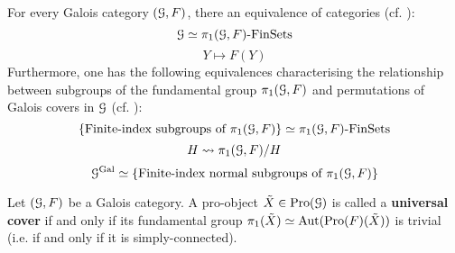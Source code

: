             \begin{proposition} \label{prop: categorical_galois_correspondence}
                For every Galois category $(\mathcal{G}, F)$, there an equivalence of categories (cf. \cite[Propositions 5.2]{SGA1}):
                    $$\mathcal{G} \simeq \pi_1(\mathcal{G}, F)\text{-}\mathrm{Fin}\mathrm{Sets}$$
                    $$Y \mapsto F(Y)$$
                Furthermore, one has the following equivalences characterising the relationship between subgroups of the fundamental group $\pi_1(\mathcal{G}, F)$ and permutations of Galois covers in $\mathcal{G}$ (cf. \cite[Propositions 5.5]{SGA1}):
                    $$\{\text{Finite-index subgroups of $\pi_1(\mathcal{G}, F)$}\} \simeq \pi_1(\mathcal{G}, F)\text{-}\mathrm{Fin}\mathrm{Sets}$$
                    $$H \leadsto \pi_1(\mathcal{G}, F)/H$$
                    $$\mathcal{G}^{\mathrm{Gal}} \simeq \{\text{Finite-index normal subgroups of $\pi_1(\mathcal{G}, F)$}\}$$
            \end{proposition}
                
            \begin{definition} \label{def: universal_covers}
                Let $(\mathcal{G}, F)$ be a Galois category. A pro-object $\tilde{X} \in \mathrm{Pro}(\mathcal{G})$ is called a \textbf{universal cover} if and only if its fundamental group $\pi_1(\tilde{X}) \simeq \mathrm{Aut}(\mathrm{Pro}(F)(\tilde{X}))$ is trivial (i.e. if and only if it is simply-connected).
            \end{definition}
            \begin{remark} \label{remark: fundamental_groups_are_automorphism_groups_of_universal_covers}
                
            \end{remark}
            

